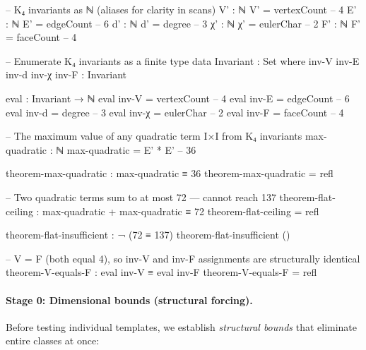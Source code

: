 \documentclass[11pt,a4paper]{article}
\begin{document}
\begin{code}
-- K₄ invariants as ℕ (aliases for clarity in scans)
V' : ℕ
V' = vertexCount      -- 4
E' : ℕ
E' = edgeCount        -- 6
d' : ℕ
d' = degree           -- 3
χ' : ℕ
χ' = eulerChar        -- 2
F' : ℕ
F' = faceCount        -- 4

-- Enumerate K₄ invariants as a finite type
data Invariant : Set where
  inv-V inv-E inv-d inv-χ inv-F : Invariant

eval : Invariant → ℕ
eval inv-V = vertexCount      -- 4
eval inv-E = edgeCount        -- 6
eval inv-d = degree           -- 3
eval inv-χ = eulerChar        -- 2
eval inv-F = faceCount        -- 4

-- The maximum value of any quadratic term I×I from K₄ invariants
max-quadratic : ℕ
max-quadratic = E' * E'  -- 36

theorem-max-quadratic : max-quadratic ≡ 36
theorem-max-quadratic = refl

-- Two quadratic terms sum to at most 72 — cannot reach 137
theorem-flat-ceiling : max-quadratic + max-quadratic ≡ 72
theorem-flat-ceiling = refl

theorem-flat-insufficient : ¬ (72 ≡ 137)
theorem-flat-insufficient ()

-- V = F (both equal 4), so inv-V and inv-F assignments are structurally identical
theorem-V-equals-F : eval inv-V ≡ eval inv-F
theorem-V-equals-F = refl
\end{code}


\paragraph{Stage 0: Dimensional bounds (structural forcing).}
Before testing individual templates, we establish \emph{structural bounds}
that eliminate entire classes at once:
\end{document}
